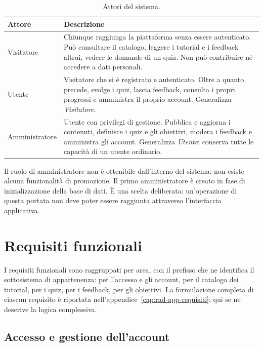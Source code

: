 \begin{table}[H]
\centering
\begin{tabular}{@{}L{3.0cm} L{11.2cm}@{}}
\toprule
\textbf{Attore} & \textbf{Descrizione} \\
\midrule
Visitatore &
Chiunque raggiunga la piattaforma senza essere autenticato. Può consultare
il catalogo, leggere i tutorial e i feedback altrui, vedere le domande di un
quiz. Non può contribuire né accedere a dati personali. \\

Utente &
Visitatore che si è registrato e autenticato. Oltre a quanto precede, svolge
i quiz, lascia feedback, consulta i propri progressi e amministra il proprio
account. Generalizza \emph{Visitatore}. \\

Amministratore &
Utente con privilegi di gestione. Pubblica e aggiorna i contenuti, definisce
i quiz e gli obiettivi, modera i feedback e amministra gli account.
Generalizza \emph{Utente}: conserva tutte le capacità di un utente ordinario.
\\
\bottomrule
\end{tabular}
\caption{Attori del sistema.}
\label{tab:rad-attori}
\end{table}

\begin{nota}
Il ruolo di amministratore non è ottenibile dall'interno del sistema: non
esiste alcuna funzionalità di promozione. Il primo amministratore è creato
in fase di inizializzazione della base di dati. È una scelta deliberata:
un'operazione di questa portata non deve poter essere raggiunta attraverso
l'interfaccia applicativa.
\end{nota}

\section{Requisiti funzionali}
\label{sec:rad-rf}

I requisiti funzionali sono raggruppati per area, con il prefisso che ne
identifica il sottosistema di appartenenza:
 per l'accesso e gli account,
 per il catalogo dei tutorial,
 per i quiz,
 per i feedback,
 per gli obiettivi.
La formulazione completa di ciascun requisito è riportata
nell'appendice~\ref{cap:rad-app-requisiti}; qui se ne descrive la logica complessiva.

\subsection{Accesso e gestione dell'account}

